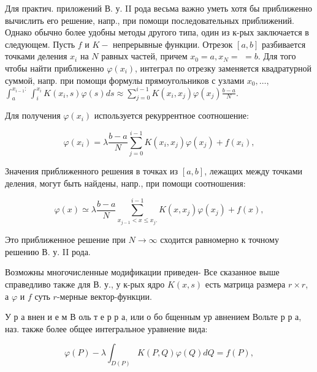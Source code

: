 \documentclass[10pt]{article}
\begin{document}
Для практич. приложений В. у. II рода весьма важно уметь хотя бы приближенно вычислить его решение, напр., при помощи последовательных приближений. Однако обычно более удобны методы другого типа, один из к-рых заключается в следующем. Пусть $f$ и $K-$ непрерывные функции. Отрезок $[a, b]$ разбивается точками деления $x_{i}$ на $N$ равных частей, причем $x_{0}=a, x_{N}=$ $=b$. Для того чтобы найти приближенно $\varphi\left(x_{i}\right)$, интеграл по отрезку заменяется квадратурной суммой, напр. при помощи формулы прямоугольников с узлами $x_{0}, \ldots$, $\int_{a}^{x_{i-1}:} \int_{i}^{x_{i}} K\left(x_{i}, s\right) \varphi(s) d s \approx \sum_{j=0}^{i-1} K\left(x_{i}, x_{j}\right) \varphi\left(x_{j}\right) \frac{b-a}{N}$.



Для получения $\varphi\left(x_{i}\right)$ используется рекуррентное соотношение:



\[

\varphi\left(x_{i}\right)=\lambda \frac{b-a}{N} \sum_{j=0}^{i-1} K\left(x_{i}, x_{j}\right) \varphi\left(x_{j}\right)+f\left(x_{i}\right),

\]



Значения приближенного решения в точках из $[a, b]$, лежащих между точками деления, могут быть найдены, напр., при помощи соотношения:



\[

\varphi(x) \simeq \lambda \frac{b-a}{N} \sum_{x_{j-1}<x \leqslant x_{j} .}^{i-1} K\left(x, x_{j}\right) \varphi\left(x_{j}\right)+f(x),

\]



Это приближенное решение при $N \rightarrow \infty$ сходится равномерно к точному решению В. у. II рода.



Возможны многочисленные модификации приведен- Все сказанное выше справедливо также для В. у., у к-рых ядро $K(x, s)$ есть матрица размера $r \times r$, а $\varphi$ и $f$ суть $r$-мерные вектор-функции.



У р а внен и е м В оль т е р р а, или о бо бщенным ур авнением Вольте р р а, наз. также более общее интегральное уравнение вида:



\[

\varphi(P)-\lambda \int_{D(P)} K(P, Q) \varphi(Q) d Q=f(P),

\]
\end{document}
